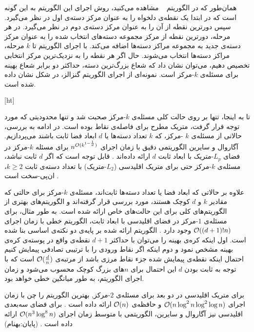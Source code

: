 همان‌طور که در الگوریتم ~ مشاهده می‌کنید، روش اجرای این الگوریتم به این گونه است که در ابتدا یک نقطه‌ی دلخواه را به عنوان مرکز دسته‌ی اول در نظر می‌گیرد.
سپس دورترین نقطه از آن را به عنوان مرکز دسته‌ی دوم در نظر می‌گیرد.
در هر مرحله، دورترین نقطه از مرکز مجموعه دسته‌های انتخاب شده را به عنوان مرکز دسته‌ی جدید به مجموعه مراکز دسته‌ها اضافه می‌کند.
با اجرای الگوریتم تا $k$ مرحله، مراکز دسته‌ها انتخاب می‌شوند.
حال اگر هر نقطه را به نزدیک‌ترین مرکز انتخابی تخصیص دهیم، می‌توان نشان داد که شعاع بزرگ‌ترین دسته، حداکثر دو برابر شعاع بهینه برای مسئله‌ی $k$-مرکز است.
نمونه‌ای از اجرای الگوریتم گنزالز، در شکل  نشان داده شده است.

[ht]

تا به اینجا، تنها بر روی حالت کلی مسئله‌ی $k$-مرکز صحبت شد و تنها محدودیتی که مورد توجه قرار گرفت، متریک مطرح برای فاصله‌ی نقاط بوده است.
در ادامه به بررسی، حالاتی از مسئله‌ی $k$ -مرکز، که $k$ تعداد دسته‌ها یا $d$ ابعاد فضا ثابت باشند می‌پردازیم.
آگاروال و سایرین الگوریتمی دقیق با زمان اجرای $n^{\mathcal{O}(k^{1 - \frac{1}{d}})}$ برای مسئله $k$-مرکز در فضای $L_p$-متریک با ابعاد ثابت $d$ ارائه داده‌اند .
قابل توجه است که اگر $d$ ثابت نباشد، مسئله‌ی $k$-مرکز حتی برای متریک اقلیدسی ($L_2$-متریک) با تعداد دسته‌ی ثابت $k \geq 2$، ان‌پی-سخت است .

علاوه بر حالاتی که ابعاد فضا یا تعداد دسته‌ها ثابت‌اند، مسئله‌ی $k$-مرکز برای حالتی که مقادیر $k$ و $d$ کوچک هستند، مورد بررسی قرار گرفته‌اند و الگوریتم‌های بهتری از الگوریتم‌های کلی برای این حالت‌های خاص ارائه شده است.
به طور مثال، برای مسئله‌ی $1$-مرکز در فضای اقلیدسی با ابعاد ثابت، الگوریتم خطی با زمان اجرای $\mathcal{O}((d+1)! n)$ وجود دارد .
الگوریتم ارائه شده بر پایه‌ی دو نکته‌ی اساسی بنا شده است.
اول اینکه کره‌ی بهینه را می‌توان با حداکثر $d+1$ نقطه‌ی واقع در پوسته‌ی کره‌ی بهینه مشخص نمود و دوم اینکه اگر نقاط ورودی را با ترتیبی تصادفی پیمایش کنیم احتمال اینکه نقطه‌ی پیمایش شده جزء نقاط مرزی باشد از مرتبه‌ی $\mathcal{O}(\frac{d}{n})$ است که با توجه به ثابت بودن $d$ این احتمال برای $n$های بزرگ کوچک محسوب می‌شود و زمان اجرای الگوریتم، به طور میانگین خطی خواهد بود. 


برای متریک اقلیدسی در دو بعد برای مسئله‌ی $2$-مرکز, بهترین الگوریتم را چن با زمان اجرای $\mathcal{O}(n \log^2{n} \log^2{\log{n}})$ و حافظه‌ی $\mathcal{O}(n)$ ارائه داده است .
برای فضای سه‌بعدی اقلیدسی نیز آگاروال و سایرین، الگوریتمی با متوسط زمان اجرای $\mathcal{O}(n^3\log^8{n})$ ارائه داده است .
(پایان:بهنام)


